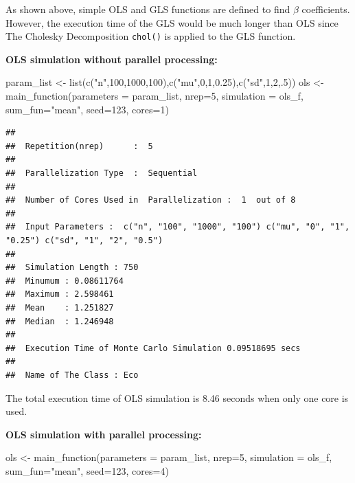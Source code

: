 \documentclass[11pt,a4paper]{article}
\newenvironment{Shaded}{\begin{snugshade}}{\end{snugshade}}
\newcommand{\AttributeTok}[1]{\textcolor[rgb]{0.77,0.63,0.00}{#1}}
\newcommand{\DecValTok}[1]{\textcolor[rgb]{0.00,0.00,0.81}{#1}}
\newcommand{\FloatTok}[1]{\textcolor[rgb]{0.00,0.00,0.81}{#1}}
\newcommand{\FunctionTok}[1]{\textcolor[rgb]{0.00,0.00,0.00}{#1}}
\newcommand{\NormalTok}[1]{#1}
\newcommand{\OtherTok}[1]{\textcolor[rgb]{0.56,0.35,0.01}{#1}}
\newcommand{\StringTok}[1]{\textcolor[rgb]{0.31,0.60,0.02}{#1}}
\begin{document}
As shown above, simple OLS and GLS functions are defined to find
\(\beta\) coefficients. However, the execution time of the GLS would be
much longer than OLS since The Cholesky Decomposition \texttt{chol()} is
applied to the GLS function.

\textbf{OLS simulation without parallel processing:}

\begin{Shaded}
\begin{Highlighting}[]
\NormalTok{ param\_list }\OtherTok{\textless{}{-}} \FunctionTok{list}\NormalTok{(}\FunctionTok{c}\NormalTok{(}\StringTok{"n"}\NormalTok{,}\DecValTok{100}\NormalTok{,}\DecValTok{1000}\NormalTok{,}\DecValTok{100}\NormalTok{),}\FunctionTok{c}\NormalTok{(}\StringTok{"mu"}\NormalTok{,}\DecValTok{0}\NormalTok{,}\DecValTok{1}\NormalTok{,}\FloatTok{0.25}\NormalTok{),}\FunctionTok{c}\NormalTok{(}\StringTok{"sd"}\NormalTok{,}\DecValTok{1}\NormalTok{,}\DecValTok{2}\NormalTok{,.}\DecValTok{5}\NormalTok{))}
\NormalTok{ols }\OtherTok{\textless{}{-}} \FunctionTok{main\_function}\NormalTok{(}\AttributeTok{parameters =}\NormalTok{ param\_list,}
                     \AttributeTok{nrep=}\DecValTok{5}\NormalTok{,}
                     \AttributeTok{simulation =}\NormalTok{ ols\_f,}
                     \AttributeTok{sum\_fun=}\StringTok{"mean"}\NormalTok{,}
                     \AttributeTok{seed=}\DecValTok{123}\NormalTok{,}
                     \AttributeTok{cores=}\DecValTok{1}\NormalTok{)}
\end{Highlighting}
\end{Shaded}

\begin{verbatim}
## 
##  Repetition(nrep)      :  5 
## 
##  Parallelization Type  :  Sequential 
## 
##  Number of Cores Used in  Parallelization :  1  out of 8 
## 
##  Input Parameters :  c("n", "100", "1000", "100") c("mu", "0", "1", "0.25") c("sd", "1", "2", "0.5") 
## 
##  Simulation Length : 750 
##  Minumum : 0.08611764 
##  Maximum : 2.598461 
##  Mean    : 1.251827 
##  Median  : 1.246948 
## 
##  Execution Time of Monte Carlo Simulation 0.09518695 secs 
## 
##  Name of The Class : Eco
\end{verbatim}

The total execution time of OLS simulation is 8.46 seconds when only one
core is used.

\textbf{OLS simulation with parallel processing:}

\begin{Shaded}
\begin{Highlighting}[]
\NormalTok{ols }\OtherTok{\textless{}{-}} \FunctionTok{main\_function}\NormalTok{(}\AttributeTok{parameters =}\NormalTok{ param\_list,}
                     \AttributeTok{nrep=}\DecValTok{5}\NormalTok{,}
                     \AttributeTok{simulation =}\NormalTok{ ols\_f,}
                     \AttributeTok{sum\_fun=}\StringTok{"mean"}\NormalTok{,}
                     \AttributeTok{seed=}\DecValTok{123}\NormalTok{,}
                     \AttributeTok{cores=}\DecValTok{4}\NormalTok{)}
\end{Highlighting}
\end{Shaded}
\end{document}
